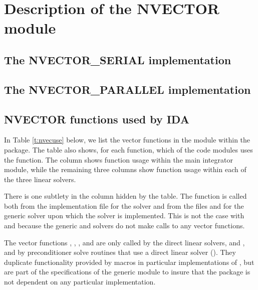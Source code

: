 \chapter{Description of the NVECTOR module}\label{s:nvector}


\section{The NVECTOR\_SERIAL implementation}\label{ss:nvec_ser}


\section{The NVECTOR\_PARALLEL implementation}\label{ss:nvec_par}


\section{NVECTOR functions used by IDA}

In Table \ref{t:nvecuse} below, we list the vector functions in the 
{\nvector} module within the {\ida} package.
The table also shows, for each function, which of the code modules uses
the function. The {\ida} column shows function usage within the main
integrator module, while the remaining three columns show function usage
within each of the three {\ida} linear solvers. 

There is one subtlety in the {\idaspgmr} column hidden by the table. 
The  function is called both from the 
implementation file  for the {\idaspgmr} solver and from
the files  and  for the generic {\spgmr} 
solver upon which the {\idaspgmr} solver is implemented. 
This is not the case with {\idadense} and {\idaband}
because the generic {\dense} and {\band} solvers 
do not make calls to any vector functions.

The vector functions , , , and
 are only called by the {\ida} direct linear solvers, 
{\idadense} and {\idaband}, and by preconditioner solve routines that use a 
direct linear solver ({\idabbdpre}). They duplicate 
functionality provided by macros in particular implementations of {\nvector},
but are part of the specifications of the generic {\nvector} module to insure 
that the {\ida} package is not dependent on any particular {\nvector} implementation.

